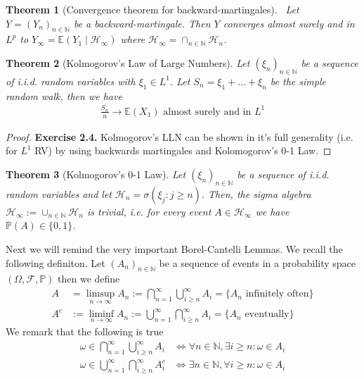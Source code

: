 \documentclass[11pt,a4paper, final]{article}
\newtheorem{thm}{Theorem}[section]
\theoremstyle{definition}
\begin{document}
\begin{thm}[Convergence theorem for backward-martingales] \ \newline Let $Y=(Y_n)_{n \in \mathbb{N}}$ be a backward-martingale. Then $Y$ converges almost surely and in $L^p$ to $Y_\infty = \mathbb{E}(Y_1 \mid \mathcal{H}_\infty )$ where $\mathcal{H}_\infty = \cap_{n \in \mathbb{N}} \mathcal{H}_n$. 
\end{thm}
\begin{thm}[Kolmogorov's Law of Large Numbers] Let $(\xi_n)_{n \in \mathbb{N}}$ be a sequence of i.i.d. random variables with $\xi_1 \in L^1$. Let $S_n = \xi_1 + \dots + \xi_n$ be the simple random walk, then we have
\begin{align*}
\frac{S_n}{n} \to \mathbb{E}(X_1) \text{ almost surely and in } L^1
\end{align*}
\end{thm}
\begin{proof}
\textbf{Exercise 2.4.} Kolmogorov's LLN can be shown in it's full generality (i.e. for $L^1$ RV) by using backwards martingales and Kolomogorov's 0-1 Law. 
\end{proof}
\begin{thm}[Kolmogorov's 0-1 Law] Let $(\xi_n)_{n \in \mathbb{N}}$ be a sequence of i.i.d. random variables and let $\mathcal{H}_n = \sigma( \xi_j : j \geq n )$. Then, the sigma algebra $\mathcal{H}_\infty := \cup_{n \in \mathbb{N}} \mathcal{H}_n$ is trivial, i.e. for every event $A \in \mathcal{H}_\infty$ we have  \\ $\mathbb{P}(A) \in \lbrace 0 ,1 \rbrace$. 
\end{thm}
\noindent Next we will remind the very important Borel-Cantelli Lemmas. We recall the following definiton. Let $(A_n)_{n \in \mathbb{N}}$ be a sequence of events in a probability space $( \Omega, \mathcal{F}, \mathbb{P})$ then we define 
\begin{align*}
A & = \limsup_{n \to \infty} A_n:= \bigcap_{n=1}^\infty \bigcup_{i \geq n}^\infty A_i = \lbrace A_n \text{ infinitely often} \rbrace  
\\
A^c &:= \liminf_{n \to \infty} A_n := \bigcup_{n=1}^\infty \bigcap_{i \geq n }^\infty A_i = \lbrace A_n \text{ eventually} \rbrace 
\end{align*}
We remark that the following is true
\begin{align*}
\omega \in \bigcap_{n=1}^\infty \bigcup_{i \geq n}^\infty A_i &\iff \forall n \in \mathbb{N}, \exists i \geq n : \omega \in A_i   \\
\omega \in \bigcup_{n=1}^\infty \bigcap_{i \geq n }^\infty A_i^c &\iff \exists n \in \mathbb{N}, \forall i \geq n : \omega \in A_i
\end{align*}
\end{document}
